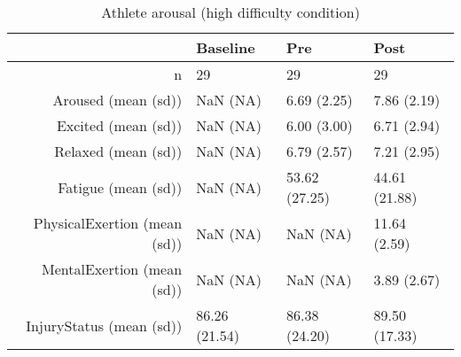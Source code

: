 \begin{table}[ht]
\centering
\begin{tabular}{rlll}
  \hline
 & Baseline & Pre & Post \\ 
  \hline
n &    29 &    29 &    29 \\ 
  Aroused (mean (sd)) &   NaN (NA) &  6.69 (2.25) &  7.86 (2.19) \\ 
  Excited (mean (sd)) &   NaN (NA) &  6.00 (3.00) &  6.71 (2.94) \\ 
  Relaxed (mean (sd)) &   NaN (NA) &  6.79 (2.57) &  7.21 (2.95) \\ 
  Fatigue (mean (sd)) &   NaN (NA) & 53.62 (27.25) & 44.61 (21.88) \\ 
  PhysicalExertion (mean (sd)) &   NaN (NA) &   NaN (NA) & 11.64 (2.59) \\ 
  MentalExertion (mean (sd)) &   NaN (NA) &   NaN (NA) &  3.89 (2.67) \\ 
  InjuryStatus (mean (sd)) & 86.26 (21.54) & 86.38 (24.20) & 89.50 (17.33) \\ 
   \hline
\end{tabular}
\caption{Athlete arousal 
 (high difficulty condition)} 
\end{table}

